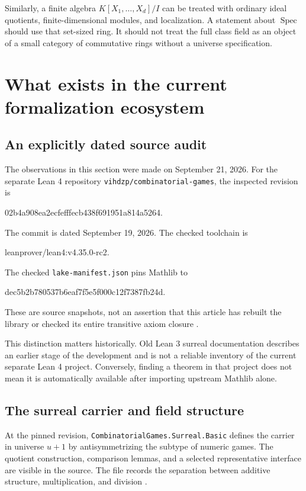 \documentclass[11pt,letterpaper]{article}
\numberwithin{equation}{section}
\theoremstyle{definition}
\theoremstyle{remark}
\newcommand{\Spec}{\operatorname{Spec}}
\begin{document}
Similarly, a finite algebra $K[X_1,\ldots,X_d]/I$ can be treated with ordinary ideal quotients, finite-dimensional modules, and localization. A statement about $\Spec$ should use that set-sized ring. It should not treat the full class field as an object of a small category of commutative rings without a universe specification.

\section{What exists in the current formalization ecosystem}\label{sec:ecosystem}

\subsection{An explicitly dated source audit}
The observations in this section were made on September 21, 2026. For the separate Lean 4 repository \texttt{vihdzp/combinatorial-games}, the inspected revision is
\begin{center}\small\ttfamily
02b4a908ea2ecfefffecb438f691951a814a5264.
\end{center}
The commit is dated September 19, 2026. The checked toolchain is
\begin{center}\small\ttfamily
leanprover/lean4:v4.35.0-rc2.
\end{center}
The checked \texttt{lake-manifest.json} pins Mathlib to
\begin{center}\small\ttfamily
dec5b2b780537b6eaf7f5e5f000c12f7387fb24d.
\end{center}
These are source snapshots, not an assertion that this article has rebuilt the library or checked its entire transitive axiom closure \cite{GamesRepo,GamesManifest}.

This distinction matters historically. Old Lean 3 surreal documentation describes an earlier stage of the development and is not a reliable inventory of the current separate Lean 4 project. Conversely, finding a theorem in that project does not mean it is automatically available after importing upstream Mathlib alone.

\subsection{The surreal carrier and field structure}
At the pinned revision, \texttt{CombinatorialGames.Surreal.Basic} defines the carrier in universe $u+1$ by antisymmetrizing the subtype of numeric games. The quotient construction, comparison lemmas, and a selected representative interface are visible in the source. The file records the separation between additive structure, multiplication, and division \cite{GamesBasic}.
\end{document}

